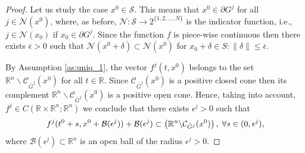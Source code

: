\documentclass[10pt,a4paper]{amsart}
\newcommand{\R}{\mathbb{R}}
\begin{document}
\begin{proof}
	Let us study the case $x^0\in \mathcal{S}$. 	This means that $x^0\in \partial G^j$ for all $j\in \mathcal{N}(x^0)$, where, as before, $\mathcal{N}:\mathcal{S}\to 2^{\{1,2,...,N\}}$ is the indicator function, i.e., $j\in \mathcal{N}(x_0)$ if $x_0\in \partial G^{j}$.
	Since the function $f$ is piece-wise continuous then  there exists $\bar \epsilon>0$ 
	such that $\mathcal{N}(x^0+\delta)\subset \mathcal{N}(x^0)$ for $x_0+\delta\in S: \|\delta\|\leq \bar \epsilon$. 
	
	
	
	By 
	Assumption \ref{as:uniq_1}, the vector $f^j(t,x^0)$ belongs to the set $\R^n\backslash \mathcal{C}_{\bar  G^{j}}(x^0)$ 
	for all $t\in \R$.
	Since $\mathcal{C}_{\bar G^{j}}(x^0)$ is a positive closed cone then its complement $\R^n\backslash \mathcal{C}_{\bar G^{j}}(x^0)$ is a positive open cone.
	Hence, taking into account,
	$f^j\in C(\R\times \R^n;\R^n)$  we conclude that there exists $\epsilon^j>0$ such that \vspace{-1mm}
	$$
    f^j(t^0+s,x^0+\mathcal{B}(\epsilon^j))+\mathcal{B}(\epsilon^j) \subset  \left(\R^n\backslash {\mathcal{C}}_{\bar G^{j}}(x^0)\right), 	\; \forall s\in (0,\epsilon^j),\vspace{-1mm}
	$$
 where $\mathcal{B}(\epsilon^j)\subset \R^n$ is an open  ball of the radius $\epsilon^j>0$.
	

\end{proof}
\end{document}
